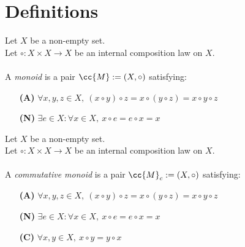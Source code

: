 \section{Definitions}

\begin{definition-pre}[Monoid]
    \label{def:monoid}
    Let \(X\) be a non-empty set.\\
    Let \(\circ: X\times X \to X\) be an internal composition law on \(X\). \\\\
    A \textit{monoid} is a pair \(\cc{M}:= (X, \circ)\) satisfying:
    \begin{enumerate}
        \item [\textbf{(A)}] \(\forall x,y,z\in X,\ (x\circ y)\circ z= x\circ (y\circ z) = x\circ y \circ z\)
        \item [\textbf{(N)}] \(\exists e \in X : \forall x \in X,\ x\circ e = e \circ x = x\)
    \end{enumerate}
\end{definition-pre}

\begin{definition-pre}
    \label{def:commutative_monoid}
    Let \(X\) be a non-empty set.\\
    Let \(\circ: X\times X \to X\) be an internal composition law on \(X\). \\\\
    A \textit{commutative monoid} is a pair \(\cc{M}_c:= (X, \circ)\) satisfying:
    \begin{enumerate}
        \item [\textbf{(A)}] \(\forall x,y,z\in X,\ (x\circ y)\circ z= x\circ (y\circ z) = x\circ y \circ z\)
        \item [\textbf{(N)}] \(\exists e \in X : \forall x \in X,\ x\circ e = e \circ x = x\)
        \item [\textbf{(C)}] \(\forall x,y\in X,\ x\circ y = y\circ x\)
    \end{enumerate}
\end{definition-pre}

